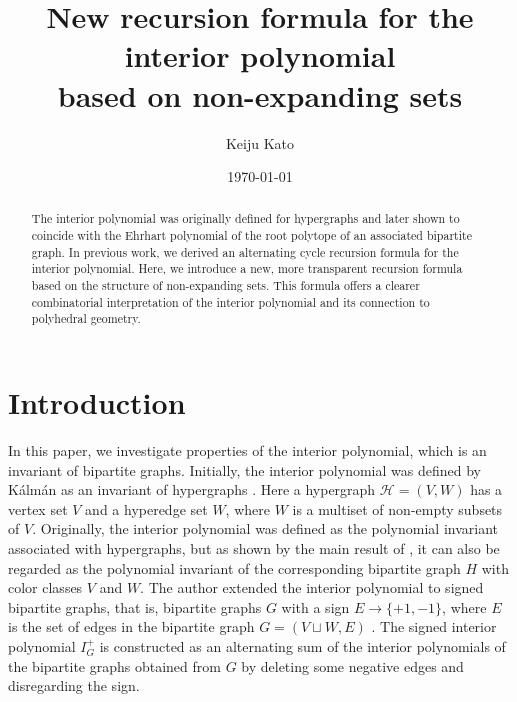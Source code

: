 \documentclass{amsart}
\title[New recursion formula for the interior polynomial]{New recursion formula for the interior polynomial\\ based on non-expanding sets}
\author{Keiju Kato}
\date{\today}
\theoremstyle{definition}
\theoremstyle{remark}
\numberwithin{equation}{section}
\begin{document}
\maketitle

\begin{abstract}
The interior polynomial was originally defined for hypergraphs and later shown to coincide with the Ehrhart polynomial of the root polytope of an associated bipartite graph. In previous work, we derived an alternating cycle recursion formula for the interior polynomial. Here, we introduce a new, more transparent recursion formula based on the structure of non-expanding sets. This formula offers a clearer combinatorial interpretation of the interior polynomial and its connection to polyhedral geometry.
\end{abstract}



\section{Introduction}
In this paper, we investigate properties of the interior polynomial, which is an invariant of bipartite graphs. Initially, the interior polynomial was defined by K\'alm\'an as an invariant of hypergraphs \cite{K}. Here a hypergraph $\mathscr{H}=(V,W)$ has a vertex set $V$ and a hyperedge set $W$, where $W$ is a multiset of non-empty subsets of $V$. Originally, the interior polynomial was defined as the polynomial invariant associated with hypergraphs, but as shown by the main result of \cite{KP}, it can also be regarded as the polynomial invariant of the corresponding bipartite graph $H$ with color classes $V$ and $W$. The author extended the interior polynomial to signed bipartite graphs, that is, bipartite graphs $G$ with a sign $E \to \{ +1 , -1 \}$, where $E$ is the set of edges in the bipartite graph $G=(V\sqcup W, E)$ \cite{kato}. The signed interior polynomial $I^+_G$ is constructed as an alternating sum of the interior polynomials of the bipartite graphs obtained from $G$ by deleting some negative edges and disregarding the sign.
\end{document}
